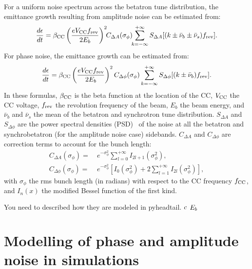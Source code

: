 For a uniform noise spectrum across the betatron tune distribution, the emittance growth resulting from amplitude noise can be estimated from:
\begin{equation}\label{eq:dey_an}
    \frac{d\epsilon}{dt}  = {\beta_\mathrm{CC}} \left( \frac{e{V_\mathrm{CC}}{f_\mathrm{rev}}}{2E_b}\right)^2 \!\! C_{\Delta A} (\sigma_{\phi}) \!\! \sum_{k=-\infty}^{+\infty} S_{\Delta A}[(k \pm \bar{\nu}_b \pm \bar{\nu}_s){f_\mathrm{rev}}].
\end{equation}
For phase noise, the emittance growth can be estimated from:
\begin{equation}\label{eq:dey_pn}
    \frac{d\epsilon}{dt}  = {\beta_\mathrm{CC}} \left( \frac{e{V_\mathrm{CC}}{f_\mathrm{rev}}}{2E_b}\right)^2 C_{\Delta \phi} (\sigma_{\phi}) \sum_{k=-\infty}^{+\infty} S_{\Delta \phi}[(k \pm \bar{\nu}_b){f_\mathrm{rev}}].
\end{equation}
 In these formulas, ${\beta_\mathrm{CC}}$ is the beta function at the location of the CC, ${V_\mathrm{CC}}$ the CC voltage, ${f_\mathrm{rev}}$ the revolution frequency of the beam, $E_b$ the beam energy, and $\bar{\nu}_b$ and $\bar{\nu}_s$ the mean of the betatron and synchrotron tune distribution. $S_{\Delta A}$ and $S_{\Delta \phi}$ are the power spectral densities (PSD)~\cite{b_papoulis1991probability} of the noise at all the betatron and synchrobetatron (for the amplitude noise case) sidebands. %
 $C_{\Delta A}$ and $C_{\Delta \phi}$ are correction terms to account for the bunch length:
\begin{align}
C_{\Delta A}(\sigma_{\phi}) = ~& e^{-\sigma_{\phi}^2}\sum_{l=0}^{+\infty} I_{2l+1}(\sigma_{\phi}^2),\\
C_{\Delta \phi}(\sigma_{\phi}) = ~& e^{-\sigma_{\phi}^2} \left[I_0(\sigma_{\phi}^2) + 2 \sum_{l=1}^{+\infty} I_{2l}(\sigma_{\phi}^2) \right],
\end{align}
with $\sigma_{\phi}$ the rms bunch length (in radians) with respect to the CC frequency ${f_\mathrm{CC}}$, and $I_n(x)$ the modified Bessel function of the first kind. 


You need to described how they are modeled in pyheadtail.
${c}$
${E_b}$


\section{Modelling of phase and amplitude noise in simulations}

